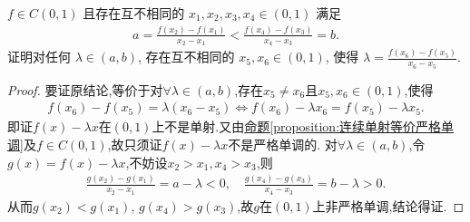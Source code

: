 \documentclass[../../main.tex]{subfiles}
\begin{document}
\begin{example}
$f \in C(0,1)$ 且存在互不相同的 $x_1, x_2, x_3, x_4 \in (0,1)$ 满足
\begin{align*}
a = \frac{f(x_2) - f(x_1)}{x_2 - x_1} < \frac{f(x_4) - f(x_3)}{x_4 - x_3} = b.
\end{align*}
证明对任何 $\lambda \in (a, b)$, 存在互不相同的 $x_5, x_6 \in (0,1)$, 使得 $\lambda = \frac{f(x_6) - f(x_5)}{x_6 - x_5}$.
\end{example}
\begin{proof}
要证原结论,等价于对$\forall \lambda \in (a,b)$,存在$x_5 \ne x_6$且$x_5,x_6 \in (0,1)$,使得
\begin{align*}
f(x_6) -f(x_5) = \lambda (x_6-x_5) \Leftrightarrow f(x_6) -\lambda x_6=f(x_5) -\lambda x_5.
\end{align*}
即证$f(x) -\lambda x$在$(0,1)$上不是单射.又由\hyperref[proposition:连续单射等价严格单调]{命题\ref{proposition:连续单射等价严格单调}}及$f\in C(0,1)$,故只须证$f(x) -\lambda x$不是严格单调的.
对$\forall \lambda \in (a,b)$,令$g(x) =f(x) -\lambda x$,不妨设$x_2>x_1,x_4>x_3$,则  
\begin{align*}
\frac{g(x_2) -g(x_1)}{x_2-x_1}=a-\lambda <0,\quad \frac{g(x_4) -g(x_3)}{x_4-x_3}=b-\lambda >0.
\end{align*}
从而$g(x_2) <g(x_1)$, $g(x_4) >g(x_3)$,故$g$在$(0,1)$上非严格单调,结论得证.

\end{proof}
\end{document}
